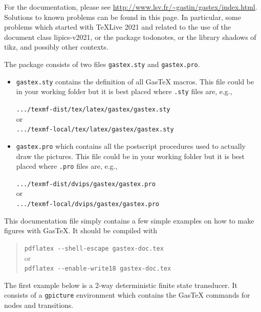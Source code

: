 \documentclass[12pt]{article}
\newcommand\GasTeX{\textsf{GasTeX}\xspace}
\begin{document}
For the documentation, please see \url{http://www.lsv.fr/~gastin/gastex/index.html}.
Solutions to known problems can be found in this page.  In particular, some problems which
started with TeXLive 2021 and related to the use of the document class
\textsf{lipics-v2021}, or the package \textsf{todonotes}, or the library \textsf{shadows} of
\textsf{tikz}, and possibly other contexts.


The package consists of two files \verb|gastex.sty| and \verb|gastex.pro|.
\begin{itemize}
  \item \verb|gastex.sty| contains the definition of all \GasTeX macros.
  This file could be in your working folder but it is best placed where \verb|.sty| files are, e.g.,
  
  \verb|.../texmf-dist/tex/latex/gastex/gastex.sty| \\  
  or \\  
  \verb|.../texmf-local/tex/latex/gastex/gastex.sty|

  \item  \verb|gastex.pro| which contains all the postscript procedures used to actually draw the pictures.
  This file could be in your working folder but it is best placed where \verb|.pro| files are, e.g.,
  
  \verb|.../texmf-dist/dvips/gastex/gastex.pro| \\
  or \\  
  \verb|.../texmf-local/dvips/gastex/gastex.pro|
\end{itemize}

This documentation file simply contains a few simple examples on how to make figures with
\GasTeX. It should be compiled with
\begin{quote}
  \verb|pdflatex --shell-escape gastex-doc.tex| \\ 
  or \\
  \verb|pdflatex --enable-write18 gastex-doc.tex|
\end{quote}

The first example below is a 2-way deterministic finite state transducer. It consists of 
a \verb|gpicture| environment which contains the \GasTeX commands for nodes and 
transitions.
\end{document}

